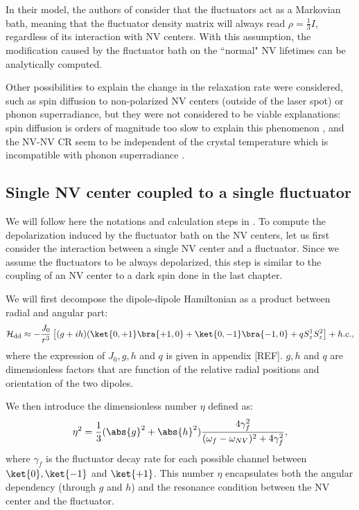 \documentclass[a4paper,11pt]{report}
\begin{document}
In their model, the authors of \citep{choi2017depolarization} consider that the fluctuators act as a Markovian bath, meaning that the fluctuator density matrix will always read $\rho = \frac{1}{3} I$, regardless of its interaction with NV centers. With this assumption, the modification caused by the fluctuator bath on the ``normal" NV lifetimes can be analytically computed.

Other possibilities to explain the change in the relaxation rate were considered, such as spin diffusion to non-polarized NV centers (outside of the laser spot) or phonon superradiance, but they were not considered to be viable explanations: spin diffusion is orders of magnitude too slow to explain this phenomenon \citep{choi2017depolarization}, and the NV-NV CR seem to be independent of the crystal temperature \citep{jarmola2012temperature, mrozek2015longitudinal} which is incompatible with phonon superradiance \citep{choi2017depolarization}.


\subsection{Single NV center coupled to a single fluctuator}
We will follow here the notations and calculation steps in \citep{choi2017depolarization}. To compute the depolarization induced by the fluctuator bath on the NV centers, let us first consider the interaction between a single NV center and a fluctuator. Since we assume the fluctuators to be always depolarized, this step is similar to the coupling of an NV center to a dark spin done in the last chapter.

We will first decompose the dipole-dipole Hamiltonian as a product between radial and angular part:
\begin{equation}
\mathcal{H}_{\rm dd} \approx - \frac{J_0}{r^3} \left[(g+ih)(\ket{0,+1}\bra{+1,0}+\ket{0,-1}\bra{-1,0}+qS_z^1 S_z^2 \right] + h.c. ,
\end{equation}
where the expression of $J_0, g, h$ and $q$ is given in appendix [REF]. $g, h$ and $q$ are dimensionless factors that are function of the relative radial positions and orientation of the two dipoles.

We then introduce the dimensionless number $\eta$ defined as:
\begin{equation}
\label{eq eta}
\eta^2=\frac{1}{3} (\abs{g}^2+\abs{h}^2)  \frac{4\gamma_f^2}{(\omega_f - \omega_{NV})^2+4\gamma_f^2},
\end{equation}
where $\gamma_f$ is the fluctuator decay rate for each possible channel between $\ket{0}, \ket{-1}$ and $\ket{+1}$. This number $\eta$ encapsulates both the angular dependency (through $g$ and $h$) and the resonance condition between the NV center and the fluctuator.
\end{document}
